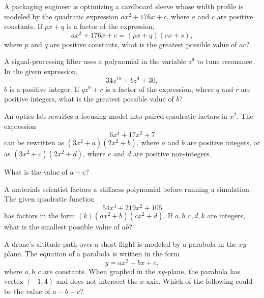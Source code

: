 \noindent\markforreview
\vspace{1em}

A packaging engineer is optimizing a cardboard sleeve whose width profile is modeled by the quadratic expression \(ax^2 + 176x + c\), where \(a\) and \(c\) are positive constants. If \(px + q\) is a factor of the expression,
\[
ax^2 + 176x + c = (px + q)(rx + s),
\]
where \(p\) and \(q\) are positive constants, what is the greatest possible value of \(ac\)?


\vspace{2em}
\newpage

\noindent\markforreview
\vspace{1em}

A signal-processing filter uses a polynomial in the variable \(z^9\) to tune resonance. In the given expression,
\[
34z^{18} + b z^9 + 30,
\]
\(b\) is a positive integer. If \(qz^9 + r\) is a factor of the expression, where \(q\) and \(r\) are positive integers, what is the greatest possible value of \(b\)?


\vspace{2em}
\newpage

\noindent\markforreview
\vspace{1em}

An optics lab rewrites a focusing model into paired quadratic factors in \(x^2\). The expression
\[
6x^4 + 17x^2 + 7
\]
can be rewritten as \((3x^2 + a)(2x^2 + b)\), where \(a\) and \(b\) are positive integers, or as \((3x^2 + c)(2x^2 + d)\), where \(c\) and \(d\) are positive non-integers.

What is the value of \(a + c\)?


\vspace{2em}
\newpage

\noindent\markforreview
\vspace{1em}

A materials scientist factors a stiffness polynomial before running a simulation. The given quadratic function
\[
54x^4 + 219x^2 + 105
\]
has factors in the form \((k)(ax^2 + b)(cx^2 + d)\). If \(a, b, c, d, k\) are integers, what is the smallest possible value of \(ab\)?


\vspace{2em}
\newpage

\noindent\markforreview
\vspace{1em}

A drone’s altitude path over a short flight is modeled by a parabola in the \(xy\)-plane. The equation of a parabola is written in the form
\[
y = ax^2 + bx + c,
\]
where \(a, b, c\) are constants. When graphed in the \(xy\)-plane, the parabola has vertex \((-1, 4)\) and does not intersect the \(x\)-axis. Which of the following could be the value of \(a - b - c\)?

